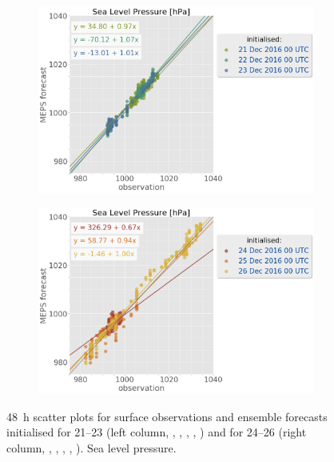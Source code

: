 \begin{figure}[t!]
	\centering
	\begin{subfigure}[b]{0.49\textwidth}
		\includegraphics[trim={0.cm 0cm 12.5cm 0cm},clip,
		width=\textwidth]{./fig_sfc_pressure/obs_model_20161221_23_00}
		\caption{}\label{fig:scat:pres2123}
	\end{subfigure}
	\begin{subfigure}[b]{0.49\textwidth}
		\includegraphics[trim={0.cm 0cm 12.5cm 0cm},clip,
		width=\textwidth]{./fig_sfc_pressure/obs_model_20161224_26_00}
		\caption{}\label{fig:scat:pres2426}
	\end{subfigure}
    \caption{\SI{48}{\hour} scatter plots for surface observations and ensemble forecasts initialised for \SIrange{21}{23}{\dec} (left column, \protect{}, \protect{}, \protect{}, \protect{}, \protect{}) and  for \SIrange{24}{26}{\dec} (right column, \protect{}, \protect{}, \protect{}, \protect{}, \protect{}). Sea level pressure.}\label{fig:scat:obs_meps}
\end{figure}
